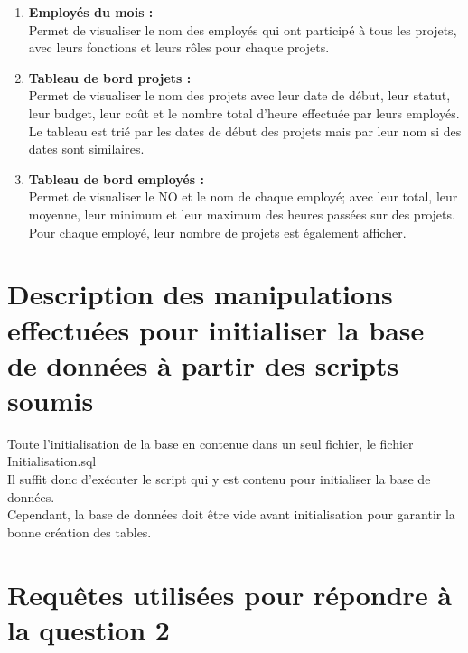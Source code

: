 \documentclass[a4paper, 11pt]{article}
\begin{document}
\begin{enumerate}
\item \textbf{Employés du mois :}\\
Permet de visualiser le nom des employés qui ont participé à tous les projets, avec leurs fonctions et leurs rôles pour chaque projets.\\

\item \textbf{Tableau de bord projets :}\\
Permet de visualiser le nom des projets avec leur date de début, leur statut, leur budget, leur coût et le nombre total d'heure effectuée par leurs employés. Le tableau est trié par les dates de début des projets mais par leur nom si des dates sont similaires.\\

\item \textbf{Tableau de bord employés :}\\
Permet de visualiser le NO et le nom de chaque employé; avec leur total, leur moyenne, leur minimum et leur maximum des heures passées sur des projets. Pour chaque employé, leur nombre de projets est également afficher.\\

\end{enumerate}


\section{Description des manipulations effectuées pour initialiser la base de
données à partir des scripts soumis}

Toute l'initialisation de la base en contenue dans un seul fichier, le fichier Initialisation.sql\\
Il suffit donc d'exécuter le script qui y est contenu pour initialiser la base de données.\\
Cependant, la base de données doit être vide avant initialisation pour garantir la bonne création des tables.\\


\section{Requêtes utilisées pour répondre à la question 2}
\end{document}
